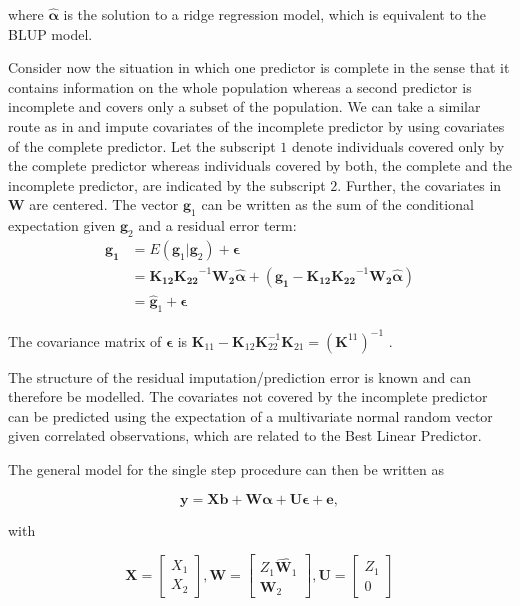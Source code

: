 \documentclass[12pt,titlepage]{article}
\begin{document}
where $\boldsymbol{\hat{\alpha}}$ is the solution to a ridge regression model,
which is equivalent to the BLUP model.

Consider now the situation in which one predictor is complete in the sense that
it contains information on the whole population whereas a second predictor is
incomplete and covers only a subset of the population.
We can take a similar route as in  and impute covariates 
of the incomplete predictor by using covariates of the complete predictor.
Let the subscript $1$ denote individuals covered only by the complete
predictor whereas individuals covered by both, the complete and the
incomplete predictor, are indicated by the subscript $2$.
Further, the covariates in $\mathbf{W}$ are centered.
The vector $\mathbf{g}_1$ can be written as the sum of the conditional 
expectation given $\mathbf{g}_2$ and a residual error term:
\begin{align} \label{eq:mrna1}
	\mathbf{g_1} &= E(\mathbf{g}_1|\mathbf{g}_2) + \boldsymbol{\epsilon} \\
	&= \mathbf{K_{12}}\mathbf{K_{22}}^{-1}\mathbf{W_2}\boldsymbol{\hat{\alpha}} + (\mathbf{g_1} - \mathbf{K_{12}}\mathbf{K_{22}}^{-1}\mathbf{W_2}\boldsymbol{\hat{\alpha}}) \\
	&= \mathbf{\hat{g}}_1 + \boldsymbol{\epsilon}
\end{align}

The covariance matrix of $\boldsymbol{\epsilon}$ is $\mathbf{K}_{11} - \mathbf{K}_{12}\mathbf{K}_{22}^{-1}\mathbf{K}_{21} = (\mathbf{K}^{11})^{-1}$
\cite{Legarra2009}.

The structure of the residual imputation/prediction error is known and can 
therefore be modelled.
The covariates not covered by the incomplete predictor can be predicted using 
the expectation of a multivariate normal random vector given correlated 
observations, which are related to the Best Linear Predictor.

The general model for the single step procedure can then be written as 

\begin{equation} \label{eq:single-step-model}
\mathbf{y} = \mathbf{Xb} + \mathbf{W} \boldsymbol{\alpha} + \mathbf{U} \boldsymbol{\epsilon} + \mathbf{e},
\end{equation}

with

\begin{equation} \label{eq:single-step-submatrices}
\mathbf{X} = 
\begin{bmatrix}
  X_1 \\
  X_2 
 \end{bmatrix},
 \mathbf{W} = 
\begin{bmatrix}
  Z_1\hat{\mathbf{W}_1} \\
  \mathbf{W}_2 
 \end{bmatrix},
 \mathbf{U} = 
\begin{bmatrix}
  Z_1 \\
  0 
 \end{bmatrix}
\end{equation}
\end{document}
